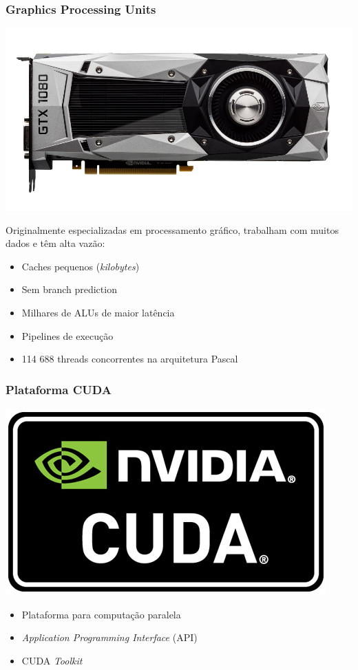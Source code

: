 \documentclass[10pt, compress]{beamer}
\begin{document}
\begin{frame}
    \frametitle{Graphics Processing Units}
    \begin{center}
        \includegraphics[width=.6\textwidth]{gtx1080}
    \end{center}

    Originalmente especializadas em \alert{processamento gráfico},
    trabalham com muitos dados e têm \alert{alta vazão}:
    \begin{itemize}
        \item Caches pequenos (\textit{kilobytes})
        \item Sem \alert{branch prediction}
        \item \alert{Milhares} de ALUs de \alert{maior latência}
        \item \alert{Pipelines} de execução
        \item 114 688 \alert{threads} concorrentes na arquitetura Pascal
    \end{itemize}
\end{frame}

\begin{frame}
    \frametitle{Plataforma CUDA}
    \begin{center}
        \includegraphics[width=.4\textwidth]{cuda-logo}
    \end{center}
    \begin{itemize}
        \item Plataforma para \alert{computação paralela}
        \item \textit{Application Programming Interface} (API)
        \item CUDA \textit{Toolkit}
    \end{itemize}
\end{frame}
\end{document}
